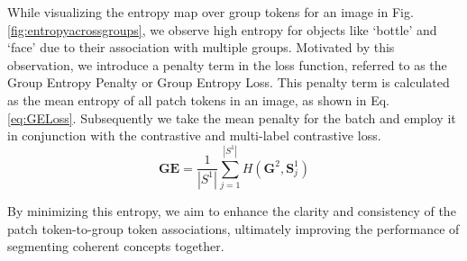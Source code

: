 While visualizing the entropy map over group tokens for an image in Fig. \ref{fig:entropyacrossgroups}, we observe high entropy for objects like `bottle' and `face' due to their association with multiple groups. Motivated by this observation, we introduce a penalty term in the loss function, referred to as the Group Entropy Penalty or Group Entropy Loss. This penalty term is calculated as the mean entropy of all patch tokens in an image, as shown in Eq. \ref{eq:GELoss}. Subsequently we take the mean penalty for the batch and employ it in conjunction with the contrastive and multi-label contrastive loss.
\begin{equation}
\label{eq:GELoss}
\textbf{GE} = \frac{1}{|S^1|} \sum_{j=1}^{|S^1|} H(\textbf{G}^2, \textbf{S}^1_j)
\end{equation}

By minimizing this entropy, we aim to enhance the clarity and consistency of the patch token-to-group token associations, ultimately improving the performance of segmenting coherent concepts together.


